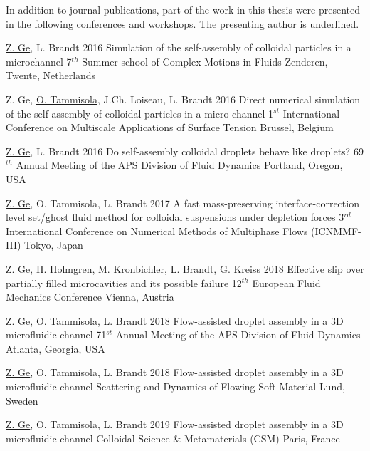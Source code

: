 \begin{conferences}
        In addition to journal publications, part of the work in this thesis were
        presented in the following conferences and workshops. The presenting author is underlined.

  \conferenceitem%
    {\underline{Z. Ge}, L. Brandt}%
    {2016}%
    {Simulation of the self-assembly of colloidal particles in a microchannel}%
    {7$^{th}$ Summer school of Complex Motions in Fluids}%
    {Zenderen, Twente, Netherlands}%

  \conferenceitem%
    {Z. Ge, \underline{O. Tammisola}, J.Ch. Loiseau, L. Brandt}%
    {2016}%
    {Direct numerical simulation of the self-assembly of colloidal particles in a micro-channel}%
    {1$^{st}$ International Conference on Multiscale Applications of Surface Tension}%
    {Brussel, Belgium}%

  \conferenceitem%
    {\underline{Z. Ge}, L. Brandt}%
    {2016}%
    {Do self-assembly colloidal droplets behave like droplets?}%
    {69$^{th}$ Annual Meeting of the APS Division of Fluid Dynamics}%
    {Portland, Oregon, USA}%

  \conferenceitem%
    {\underline{Z. Ge}, O. Tammisola, L. Brandt}%
    {2017}%
    {A fast mass-preserving interface-correction level set/ghost fluid method for colloidal suspensions under depletion forces}%
    {3$^{rd}$ International Conference on Numerical Methods of Multiphase Flows (ICNMMF-III)}%
    {Tokyo, Japan}%

  \conferenceitem%
    {\underline{Z. Ge}, H. Holmgren, M. Kronbichler, L. Brandt, G. Kreiss}%
    {2018}%
    {Effective slip over partially filled microcavities and its possible failure}%
    {12$^{th}$ European Fluid Mechanics Conference}%
    {Vienna, Austria}%

  \conferenceitem%
    {\underline{Z. Ge}, O. Tammisola, L. Brandt}%
    {2018}%
    {Flow-assisted droplet assembly in a 3D microfluidic channel}%
    {71$^{st}$ Annual Meeting of the APS Division of Fluid Dynamics}%
    {Atlanta, Georgia, USA}%

  \conferenceitem%
    {\underline{Z. Ge}, O. Tammisola, L. Brandt}%
    {2018}%
    {Flow-assisted droplet assembly in a 3D microfluidic channel}%
    {Scattering and Dynamics of Flowing Soft Material}%
    {Lund, Sweden}%

  \conferenceitem%
    {\underline{Z. Ge}, O. Tammisola, L. Brandt}%
    {2019}%
    {Flow-assisted droplet assembly in a 3D microfluidic channel}%
    {Colloidal Science \& Metamaterials (CSM)}%
    {Paris, France}%

\end{conferences}


%
\tableofcontents
